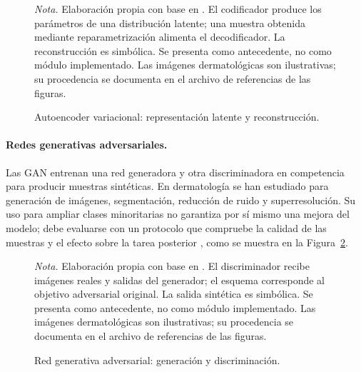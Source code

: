 \begin{figure}[!htbp]
\caption{Autoencoder variacional: representación latente y reconstrucción.}
\label{fig:original-7}
\centering

\par\smallskip
\begingroup\footnotesize\singlespacing\raggedright
\textit{Nota.} Elaboración propia con base en \parencite{kingma2014vae}. El codificador produce los parámetros de una distribución latente; una muestra obtenida mediante reparametrización alimenta el decodificador. La reconstrucción es simbólica. Se presenta como antecedente, no como módulo implementado. Las imágenes dermatológicas son ilustrativas; su procedencia se documenta en el archivo de referencias de las figuras.
\par\endgroup
\end{figure}






\paragraph{Redes generativas adversariales.} Las GAN entrenan una red generadora y otra discriminadora en competencia para producir muestras sintéticas. En dermatología se han estudiado para generación de imágenes, segmentación, reducción de ruido y superresolución. Su uso para ampliar clases minoritarias no garantiza por sí mismo una mejora del modelo; debe evaluarse con un protocolo que compruebe la calidad de las muestras y el efecto sobre la tarea posterior \parencite{ahmed2023gandermatology}, como se muestra en la Figura~\ref{fig:original-8}.

\begin{figure}[!htbp]
\caption{Red generativa adversarial: generación y discriminación.}
\label{fig:original-8}
\centering

\par\smallskip
\begingroup\footnotesize\singlespacing\raggedright
\textit{Nota.} Elaboración propia con base en \parencite{goodfellow2014gan}. El discriminador recibe imágenes reales y salidas del generador; el esquema corresponde al objetivo adversarial original. La salida sintética es simbólica. Se presenta como antecedente, no como módulo implementado. Las imágenes dermatológicas son ilustrativas; su procedencia se documenta en el archivo de referencias de las figuras.
\par\endgroup
\end{figure}






